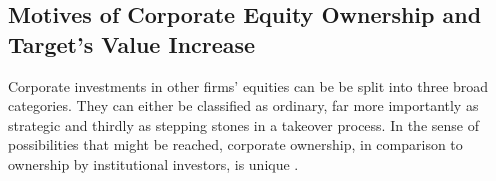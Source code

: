 \documentclass[12pt]{article}
\begin{document}




\subsection{Motives of Corporate Equity Ownership and Target's Value Increase}

Corporate investments in other firms' equities can be be split into three broad categories. They can either be classified as ordinary, far more importantly as strategic and thirdly as stepping stones in a takeover process. 
In the sense of possibilities that might be reached, corporate ownership, in comparison to ownership by institutional investors, is unique \citep[p.2791]{Allen2000}.
\end{document}
